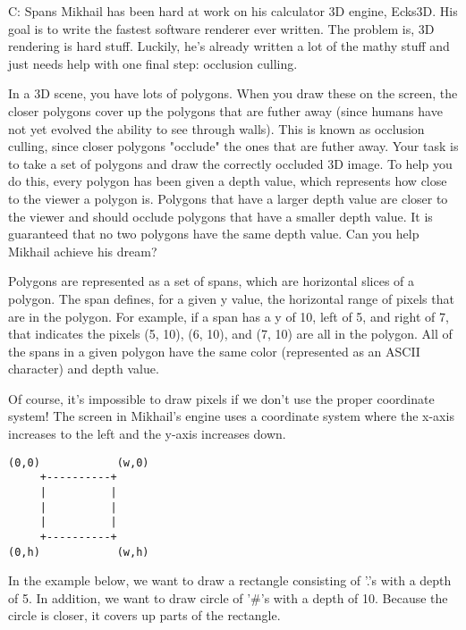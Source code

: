 \begin{problem}{C: Spans}
Mikhail has been hard at work on his calculator 3D engine, Ecks3D. His goal is to write the fastest software renderer ever written. The problem is, 3D rendering is hard stuff. Luckily, he's already written a lot of the mathy stuff and just needs help with one final step: occlusion culling.

In a 3D scene, you have lots of polygons. When you draw these on the screen, the closer polygons cover up the polygons that are futher away (since humans have not yet evolved the ability to see through walls). This is known as occlusion culling, since closer polygons "occlude" the ones that are futher away. Your task is to take a set of polygons and draw the correctly occluded 3D image. To help you do this, every polygon has been given a depth value, which represents how close to the viewer a polygon is. Polygons that have a larger depth value are closer to the viewer and should occlude polygons that have a smaller depth value. It is guaranteed that no two polygons have the same depth value. Can you help Mikhail achieve his dream?

Polygons are represented as a set of spans, which are horizontal slices of a polygon. The span defines, for a given y value, the horizontal range of pixels that are in the polygon. For example, if a span has a y of 10, left of 5, and right of 7, that indicates the pixels (5, 10), (6, 10), and (7, 10) are all in the polygon. All of the spans in a given polygon have the same color (represented as an ASCII character) and depth value.

Of course, it's impossible to draw pixels if we don't use the proper coordinate system! The screen in Mikhail's engine uses a coordinate system where the x-axis increases to the left and the y-axis increases down.

\begin{verbatim}
(0,0)            (w,0)
     +----------+
     |          |
     |          |
     |          |
     +----------+
(0,h)            (w,h)
\end{verbatim}

In the example below, we want to draw a rectangle consisting of '.'s with a depth of 5. In addition, we want to draw circle of '\#'s with a depth of 10. Because the circle is closer, it covers up parts of the rectangle.

\end{problem}

